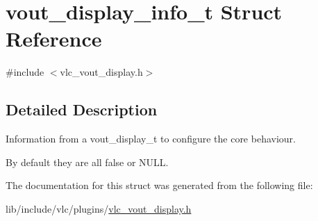 \hypertarget{structvout__display__info__t}{}\section{vout\+\_\+display\+\_\+info\+\_\+t Struct Reference}
\label{structvout__display__info__t}


{\ttfamily \#include $<$vlc\+\_\+vout\+\_\+display.\+h$>$}



\subsection{Detailed Description}
Information from a vout\+\_\+display\+\_\+t to configure the core behaviour.

By default they are all false or N\+U\+LL. 

The documentation for this struct was generated from the following file\+:\begin{DoxyCompactItemize}
\item 
lib/include/vlc/plugins/\hyperlink{vlc__vout__display_8h}{vlc\+\_\+vout\+\_\+display.\+h}\end{DoxyCompactItemize}
